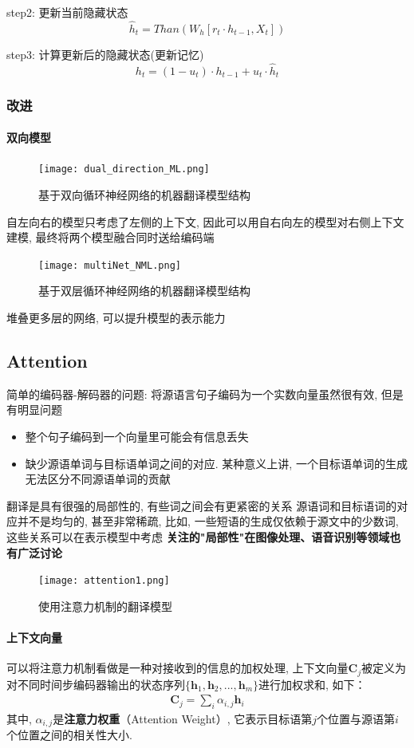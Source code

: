step2: 更新当前隐藏状态 
$$\hat{h}_t=Than(W_h[r_t \cdot h_{t-1}, X_t])$$

step3: 计算更新后的隐藏状态(更新记忆)
$$h_t=(1-u_t) \cdot h_{t-1} + u_t\cdot \hat{h}_t$$

\subsubsection{改进}
\paragraph{双向模型}

\begin{figure}[htp]
    \centering
    \texttt{[image: dual\_direction\_ML.png]}
    \caption{基于双向循环神经网络的机器翻译模型结构}
    \end{figure}
自左向右的模型只考虑了左侧的上下文, 因此可以用自右向左的模型对右侧上下文建模, 最终将两个模型融合同时送给编码端

\begin{figure}[htp]
    \centering
    \texttt{[image: multiNet\_NML.png]}
    \caption{基于双层循环神经网络的机器翻译模型结构}
    \end{figure}
 堆叠更多层的网络, 可以提升模型的表示能力
 
\subsection{Attention}

简单的编码器-解码器的问题:
将源语言句子编码为一个实数向量虽然很有效, 但是有明显问题
\begin{itemize}
    \item 
    整个句子编码到一个向量里可能会有信息丢失
    \item 
    缺少源语单词与目标语单词之间的对应. 某种意义上讲, 一个目标语单词的生成无法区分不同源语单词的贡献
\end{itemize}
翻译是具有很强的局部性的, 有些词之间会有更紧密的关系
源语词和目标语词的对应并不是均匀的, 甚至非常稀疏, 比如, 一些短语的生成仅依赖于源文中的少数词, 这些关系可以在表示模型中考虑
\textbf{关注的"局部性"在图像处理、语音识别等领域也有广泛讨论}
\begin{figure}[htp]
    \centering
    \texttt{[image: attention1.png]}
    \caption{使用注意力机制的翻译模型}
    \end{figure}
    \paragraph{上下文向量}
可以将注意力机制看做是一种对接收到的信息的加权处理, 上下文向量$\mathbf{C}_j$被定义为对不同时间步编码器输出的状态序列$\{ \mathbf{h}_1,  \mathbf{h}_2, ..., \mathbf{h}_m \}$进行加权求和, 如下：
    \begin{eqnarray}
    \mathbf{C}_j=\sum_{i} \alpha_{i, j} \mathbf{h}_i
    \end{eqnarray}
其中, $\alpha_{i, j}$是{\small\sffamily\bfseries{注意力权重}}（Attention Weight）, 它表示目标语第$j$个位置与源语第$i$个位置之间的相关性大小. 

